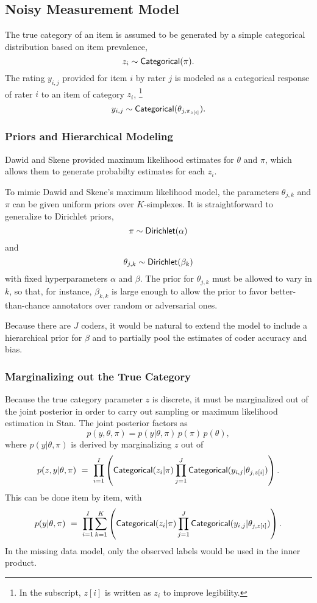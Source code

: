 \subsection{Noisy Measurement Model}

The true category of an item is assumed to be generated by a simple
categorical distribution based on item prevalence,
\[
z_i \sim \mbox{\sf Categorical}(\pi).
\]
%
The rating $y_{i,j}$ provided for item $i$ by rater $j$ is modeled as
a categorical response of rater $i$ to an item of category $z_i$,%
%
\footnote{In the subscript, $z[i]$ is written as $z_i$ to
  improve legibility.}
%
\[
y_{i,j} \sim \mbox{\sf Categorical}(\theta_{j,\pi_{z[i]}}).
\]

\subsubsection{Priors and Hierarchical Modeling}

Dawid and Skene provided maximum likelihood estimates for $\theta$ and
$\pi$, which allows them to generate probabilty estimates for each $z_i$.

To mimic Dawid and Skene's maximum likelihood model, the parameters
$\theta_{j,k}$ and $\pi$ can be given uniform priors over
$K$-simplexes.  It is straightforward to generalize to Dirichlet
priors,
\[
\pi \sim \mbox{\sf Dirichlet}(\alpha)
\]
and
\[
\theta_{j,k} \sim \mbox{\sf Dirichlet}(\beta_k)
\]
with fixed hyperparameters $\alpha$ and $\beta$.  The prior for
$\theta_{j,k}$ must be allowed to vary in $k$, so that, for instance,
$\beta_{k,k}$ is large enough to allow the prior to favor
better-than-chance annotators over random or adversarial ones.

Because there are $J$ coders, it would be natural to extend the model
to include a hierarchical prior for $\beta$ and to partially pool the
estimates of coder accuracy and bias.

\subsubsection{Marginalizing out the True Category}

Because the true category parameter $z$ is discrete, it must be
marginalized out of the joint posterior in order to carry out sampling
or maximum likelihood estimation in Stan. The joint posterior factors
as
\[
p(y, \theta, \pi) = p(y | \theta,\pi) \, p(\pi) \, p(\theta),
\]
where $p(y | \theta,\pi)$ is derived by marginalizing $z$ out of
%
\[
p(z, y | \theta, \pi)
\ = \
\prod_{i=1}^I \left( \mbox{\sf Categorical}(z_i | \pi)
                     \prod_{j=1}^J
                     \mbox{\sf Categorical}(y_{i,j}|\theta_{j,z[i]})
              \right).
\]
%
This can be done item by item, with
\[
p(y | \theta, \pi)
\ = \
\prod_{i=1}^I \sum_{k=1}^K  
  \left( \mbox{\sf Categorical}(z_i | \pi)
         \prod_{j=1}^J
         \mbox{\sf Categorical}(y_{i,j}|\theta_{j,z[i]})
  \right).
\]            
%
In the missing data model, only the observed labels would be used in
the inner product.

